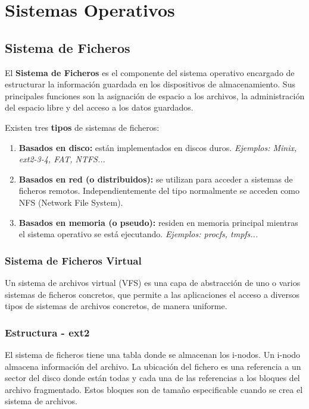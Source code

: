 \chapter{Sistemas Operativos}

\section{Sistema de Ficheros}
El \textbf{Sistema de Ficheros} es el componente del sistema operativo encargado de estructurar la información guardada en los dispositivos de almacenamiento. Sus principales funciones son la asignación de espacio a los archivos, la administración del espacio libre y del acceso a los datos guardados.

Existen tres \textbf{tipos} de sistemas de ficheros:
\begin{enumerate}
    \item \textbf{Basados en disco: }están implementados en discos duros. \textit{Ejemplos: Minix, ext2-3-4, FAT, NTFS...}
    \item \textbf{Basados en red (o distribuidos): }se utilizan para acceder a sistemas de ficheros remotos. Independientemente del tipo normalmente se acceden como NFS (Network File System).
    \item \textbf{Basados en memoria (o pseudo): }residen en memoria principal mientras el sistema operativo se está ejecutando.\textit{ Ejemplos: procfs, tmpfs...}
\end{enumerate}
\subsection{Sistema de Ficheros Virtual}
Un sistema de archivos virtual (VFS) es una capa de abstracción de uno o varios sistemas de ficheros concretos, que permite a las aplicaciones el acceso a diversos tipos de sistemas de archivos concretos, de manera uniforme.


\subsection{Estructura - ext2}
El sistema de ficheros tiene una tabla donde se almacenan los i-nodos. Un i-nodo almacena información del archivo. La ubicación del fichero es una referencia a un sector del disco donde están todas y cada una de las referencias a los bloques del archivo fragmentado. Estos bloques son de tamaño especificable cuando se crea el sistema de archivos.

